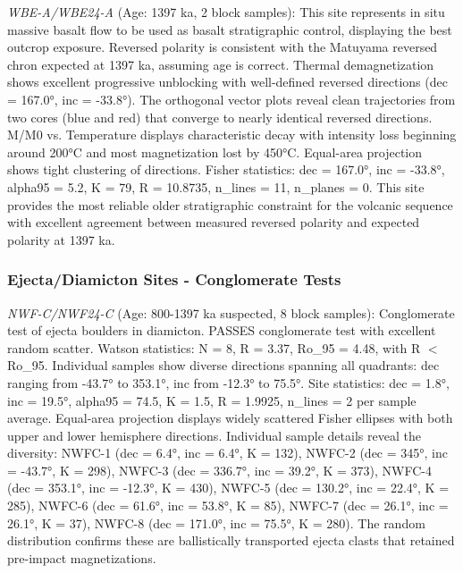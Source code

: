 \documentclass[twocolumn,11pt]{article}
\begin{document}
\textit{WBE-A/WBE24-A} (Age: 1397 ka, 2 block samples): This site represents in situ massive basalt flow to be used as basalt stratigraphic control, displaying the best outcrop exposure. Reversed polarity is consistent with the Matuyama reversed chron expected at 1397 ka, assuming age is correct. Thermal demagnetization shows excellent progressive unblocking with well-defined reversed directions (dec = 167.0°, inc = -33.8°). The orthogonal vector plots reveal clean trajectories from two cores (blue and red) that converge to nearly identical reversed directions. M/M0 vs. Temperature displays characteristic decay with intensity loss beginning around 200°C and most magnetization lost by 450°C. Equal-area projection shows tight clustering of directions. Fisher statistics: dec = 167.0°, inc = -33.8°, alpha95 = 5.2, K = 79, R = 10.8735, n\_lines = 11, n\_planes = 0. This site provides the most reliable older stratigraphic constraint for the volcanic sequence with excellent agreement between measured reversed polarity and expected polarity at 1397 ka.

\subsubsection{Ejecta/Diamicton Sites - Conglomerate Tests}

\textit{NWF-C/NWF24-C} (Age: 800-1397 ka suspected, 8 block samples): Conglomerate test of ejecta boulders in diamicton. PASSES conglomerate test with excellent random scatter. Watson statistics: N = 8, R = 3.37, Ro\_95 = 4.48, with R $<$ Ro\_95. Individual samples show diverse directions spanning all quadrants: dec ranging from -43.7° to 353.1°, inc from -12.3° to 75.5°. Site statistics: dec = 1.8°, inc = 19.5°, alpha95 = 74.5, K = 1.5, R = 1.9925, n\_lines = 2 per sample average. Equal-area projection displays widely scattered Fisher ellipses with both upper and lower hemisphere directions. Individual sample details reveal the diversity: NWFC-1 (dec = 6.4°, inc = 6.4°, K = 132), NWFC-2 (dec = 345°, inc = -43.7°, K = 298), NWFC-3 (dec = 336.7°, inc = 39.2°, K = 373), NWFC-4 (dec = 353.1°, inc = -12.3°, K = 430), NWFC-5 (dec = 130.2°, inc = 22.4°, K = 285), NWFC-6 (dec = 61.6°, inc = 53.8°, K = 85), NWFC-7 (dec = 26.1°, inc = 26.1°, K = 37), NWFC-8 (dec = 171.0°, inc = 75.5°, K = 280). The random distribution confirms these are ballistically transported ejecta clasts that retained pre-impact magnetizations.
\end{document}
